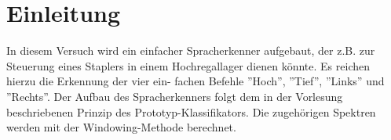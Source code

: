 \documentclass[TGAI_Laborbericht.tex]{subfiles}
\begin{document}
\chapter{Einleitung}
\label{chap:EINL}
\pagestyle{plain}
In diesem Versuch wird ein einfacher Spracherkenner aufgebaut, der z.B. zur Steuerung eines
Staplers in einem Hochregallager dienen könnte. Es reichen hierzu die Erkennung der vier ein-
fachen Befehle ”Hoch”, ”Tief”, ”Links” und ”Rechts”. Der Aufbau des Spracherkenners folgt
dem in der Vorlesung beschriebenen Prinzip des Prototyp-Klassifikators. Die zugehörigen
Spektren werden mit der Windowing-Methode berechnet.
\end{document}
